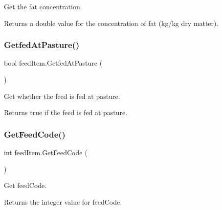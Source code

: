Get the fat concentration. 

\begin{DoxyReturn}{Returns}
a double value for the concentration of fat (kg/kg dry matter). 
\end{DoxyReturn}
\mbox{\label{classfeed_item_a2ac9193880ba846aa5d36a440b403dd2}} 
\subsubsection{\texorpdfstring{GetfedAtPasture()}{GetfedAtPasture()}}
{\footnotesize\ttfamily bool feed\+Item.\+Getfed\+At\+Pasture (\begin{DoxyParamCaption}{ }\end{DoxyParamCaption})\hspace{0.3cm}{\ttfamily [inline]}}



Get whether the feed is fed at pasture. 

\begin{DoxyReturn}{Returns}
true if the feed is fed at pasture. 
\end{DoxyReturn}
\mbox{\label{classfeed_item_a15fbee7c871fe05f99c22347981e072b}} 
\subsubsection{\texorpdfstring{GetFeedCode()}{GetFeedCode()}}
{\footnotesize\ttfamily int feed\+Item.\+Get\+Feed\+Code (\begin{DoxyParamCaption}{ }\end{DoxyParamCaption})\hspace{0.3cm}{\ttfamily [inline]}}



Get feed\+Code. 

\begin{DoxyReturn}{Returns}
the integer value for feed\+Code. 
\end{DoxyReturn}
\mbox{\label{classfeed_item_a9d415fcfd784a6432d84401c45e62284}} 
